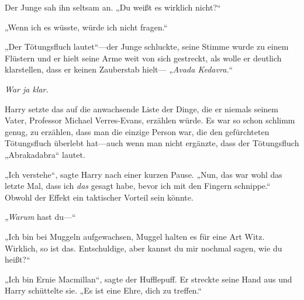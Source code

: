Der Junge sah ihn seltsam an. „Du weißt es wirklich nicht?“

„Wenn ich es wüsste, würde ich nicht fragen.“

„Der Tötungsfluch lautet“—der Junge schluckte, seine Stimme wurde zu einem Flüstern und er hielt seine Arme weit von sich gestreckt, als wolle er deutlich klarstellen, dass er keinen Zauberstab hielt— „\emph{Avada Kedavra.}“

\emph{War ja klar.}

Harry setzte das auf die anwachsende Liste der Dinge, die er niemals seinem Vater, Professor Michael Verres-Evans, erzählen würde. Es war so schon schlimm genug, zu erzählen, dass man die einzige Person war, die den gefürchteten Tötungsfluch überlebt hat—auch wenn man nicht ergänzte, dass der Tötungsfluch „Abrakadabra“ lautet.

„Ich verstehe“, sagte Harry nach einer kurzen Pause. „Nun, das war wohl das letzte Mal, dass ich \emph{das} gesagt habe, bevor ich mit den Fingern schnippe.“ Obwohl der Effekt ein taktischer Vorteil sein könnte.

\emph{„Warum} hast du—“

„Ich bin bei Muggeln aufgewachsen, Muggel halten es für eine Art Witz. Wirklich, so ist das. Entschuldige, aber kannst du mir nochmal sagen, wie du heißt?“

„Ich bin Ernie Macmillan“, sagte der Hufflepuff. Er streckte seine Hand aus und Harry schüttelte sie. „Es ist eine Ehre, dich zu treffen.“

